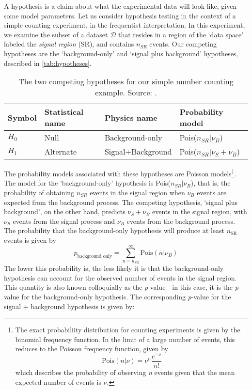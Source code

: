 A hypothesis is a claim about what the experimental data will look like, given some model parameters. Let us consider hypothesis testing in the context of a simple counting experiment, in the frequentist interpretation. In this experiment, we examine the subset of a dataset $\mathcal{D}$ that resides in a region of the `data space' labeled the \emph{signal region} (SR), and contains $n_{SR}$ events. Our competing hypotheses are the `background-only' and `signal plus background' hypotheses, described in \autoref{tab:hypotheses}. 
\begin{table}
  \begin{tabular}{llll}
    \toprule
    Symbol & Statistical name & Physics name & Probability model\\
    \midrule
    $H_0$ & Null & Background-only & Pois($n_{SR}|\nu_B$)\\
    $H_1$ & Alternate & Signal+Background & Pois($n_{SR}|\nu_S+\nu_B$)\\
    \bottomrule
  \end{tabular}
  \caption{The two competing hypotheses for our simple number counting example. Source: \cite{Cranmer2015}.}
  \label{tab:hypotheses}
\end{table}
The probability models associated with these hypotheses are Poisson models\footnote{The exact probabiliity distribution for counting experiments is given by the binomial frequency function. In the limit of a large number of events, this reduces to the Poisson frequency function, given by
  \[\text{Pois}(n|\nu) = \nu^n\frac{e^{-\nu}}{n!}\]
  which describes the probability of observing \emph{n} events given that the mean expected number of events is $\nu$.
}. The model for the 'background-only' hypothesis is Pois($n_{SR}|\nu_B$), that is, the probability of obtaining $n_{SR}$ events in the signal region when $\nu_B$ events are expected from the background process. The competing hypothesis, `signal plus background', on the other hand, predicts $\nu_S+\nu_B$ events in the signal region, with $\nu_S$ events from the signal process and $\nu_B$ events from the background process. The probability that the background-only hypothesis will produce at least $n_\text{SR}$ events is given by
\[p_\text{background only} = \sum_{n=n_\text{SR}}^\infty \text{Pois}(n|\nu_B)\]
The lower this probability is, the less likely it is that the background-only hypothesis can account for the observed number of events in the signal region. This quantity is also known colloquially as the \emph{p}-value - in this case, it is the \emph{p}-value for the background-only hypothesis. The corresponding \emph{p}-value for the signal + background hypothesis is given by:
